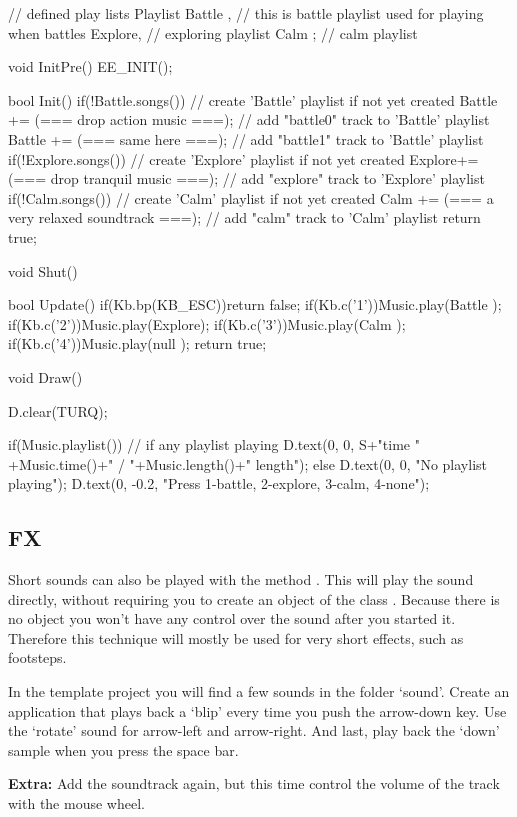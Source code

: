 \begin{code}
// defined play lists
Playlist Battle , // this is battle playlist used for playing when battles
         Explore, // exploring playlist
         Calm   ; // calm playlist

void InitPre()
{
   EE_INIT();
}

bool Init()
{
   if(!Battle.songs()) // create 'Battle' playlist if not yet created
   {
      Battle += (=== drop action music ===); // add "battle0" track to 'Battle' playlist
      Battle += (=== same here ===); // add "battle1" track to 'Battle' playlist
   }
   if(!Explore.songs()) // create 'Explore' playlist if not yet created
   {
      Explore+= (=== drop tranquil music ===); // add "explore" track to 'Explore' playlist
   }
   if(!Calm.songs())  // create 'Calm' playlist if not yet created
   {
      Calm   += (=== a very relaxed soundtrack ===); // add "calm" track to 'Calm' playlist
   }
   return true;
}

void Shut()
{
}

bool Update()
{
   if(Kb.bp(KB_ESC))return false;
   if(Kb.c('1'))Music.play(Battle );
   if(Kb.c('2'))Music.play(Explore);
   if(Kb.c('3'))Music.play(Calm   );
   if(Kb.c('4'))Music.play(null   );
   return true;
}

void Draw()
{
   D.clear(TURQ);

   if(Music.playlist()) // if any playlist playing
   {
      D.text(0, 0, S+"time " +Music.time()+" / "+Music.length()+" length");
   }else
   {
      D.text(0, 0, "No playlist playing");
   }
   D.text(0, -0.2, "Press 1-battle, 2-explore, 3-calm, 4-none");
}
\end{code}

\subsection{FX}
Short sounds can also be played with the method . This will play the sound directly, without requiring you to create an object of the class . Because there is no object you won't have any control over the sound after you started it. Therefore this technique will mostly be used for very short effects, such as footsteps. 

\begin{exercise}
In the template project you will find a few sounds in the folder `sound'. Create an application that plays back a `blip' every time you push the arrow-down key. Use the `rotate' sound for arrow-left and arrow-right. And last, play back the `down' sample when you press the space bar.

\textbf{Extra:} Add the soundtrack again, but this time control the volume of the track with the mouse wheel.
\end{exercise}
 
